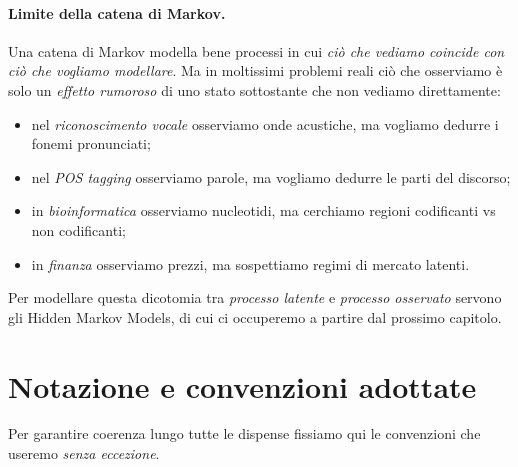 \documentclass[11pt,a4paper,oneside]{book}
\theoremstyle{plain}
\theoremstyle{definition}
\theoremstyle{remark}
\begin{document}
\paragraph{Limite della catena di Markov.}
Una catena di Markov modella bene processi in cui \emph{ciò che vediamo
coincide con ciò che vogliamo modellare}. Ma in moltissimi problemi
reali ciò che osserviamo è solo un \emph{effetto rumoroso} di uno stato
sottostante che non vediamo direttamente:

\begin{itemize}[leftmargin=*]
    \item nel \emph{riconoscimento vocale} osserviamo onde acustiche,
          ma vogliamo dedurre i fonemi pronunciati;
    \item nel \emph{POS tagging} osserviamo parole, ma vogliamo
          dedurre le parti del discorso;
    \item in \emph{bioinformatica} osserviamo nucleotidi, ma cerchiamo
          regioni codificanti vs non codificanti;
    \item in \emph{finanza} osserviamo prezzi, ma sospettiamo regimi
          di mercato latenti.
\end{itemize}

Per modellare questa dicotomia tra \emph{processo latente} e
\emph{processo osservato} servono gli Hidden Markov Models, di cui ci
occuperemo a partire dal prossimo capitolo.

\section{Notazione e convenzioni adottate}

Per garantire coerenza lungo tutte le dispense fissiamo qui le
convenzioni che useremo \emph{senza eccezione}.
\end{document}
